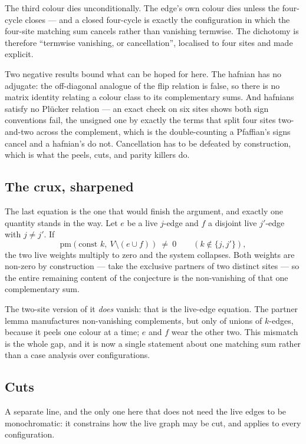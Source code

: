 \documentclass[11pt]{article}
\theoremstyle{definition}
\theoremstyle{remark}
\begin{document}
The third colour dies unconditionally. The edge's own colour dies unless the four-cycle
closes --- and a closed four-cycle is exactly the configuration in which the four-site
matching sum cancels rather than vanishing termwise. The dichotomy is therefore ``termwise
vanishing, or cancellation'', localised to four sites and made explicit.

Two negative results bound what can be hoped for here. The hafnian has no adjugate: the
off-diagonal analogue of the flip relation is false, so there is no matrix identity relating
a colour class to its complementary sums. And hafnians satisfy no Pl\"ucker relation --- an
exact check on six sites shows both sign conventions fail, the unsigned one by exactly the
terms that split four sites two-and-two across the complement, which is the double-counting a
Pfaffian's signs cancel and a hafnian's do not. Cancellation has to be defeated by
construction, which is what the peels, cuts, and parity killers do.

\subsection*{The crux, sharpened}

The last equation is the one that would finish the argument, and exactly one quantity
stands in the way. Let $e$ be a live $j$-edge and $f$ a disjoint live $j'$-edge with
$j\neq j'$. If
\[
  \mathrm{pm}\!\left(\text{const } k,\ V\setminus(e\cup f)\right)\ \neq\ 0
  \qquad (k\notin\{j,j'\}),
\]
the two live weights multiply to zero and the system collapses. Both weights are
non-zero by construction --- take the exclusive partners of two distinct sites --- so
the entire remaining content of the conjecture is the non-vanishing of that one
complementary sum.

The two-site version of it \emph{does} vanish: that is the live-edge equation. The
partner lemma manufactures non-vanishing complements, but only of unions of $k$-edges,
because it peels one colour at a time; $e$ and $f$ wear the other two. This mismatch is
the whole gap, and it is now a single statement about one matching sum rather than a
case analysis over configurations.

\subsection*{Cuts}

A separate line, and the only one here that does not need the live edges to be
monochromatic: it constrains how the live graph may be cut, and applies to every
configuration.
\end{document}
